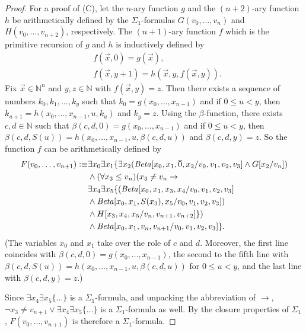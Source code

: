 \begin{proof}
For a proof of (C), let the $n$-ary function $g$ and the $(n+2)$-ary function $h$ be arithmetically defined by the $\Sigma_1$-formulas $G(v_0, \ldots, v_{n})$ and $H(v_0, \ldots, v_{n+2})$, respectively. The $(n+1)$-ary function $f$ which is the primitive recursion of $g$ and $h$ is inductively defined by 
\begin{align*}
&f(\overrightarrow{x}, 0) = g(\overrightarrow{x}), \\
& f(\overrightarrow{x}, y+1) = h( \overrightarrow{x}, y, f(\overrightarrow{x},y)). 
\end{align*}
Fix $\overrightarrow{x} \in \mathbb{N}^n$ and $y,z\in \mathbb{N}$ with $f(\overrightarrow{x}, y) = z$. Then there exists a sequence of numbers $k_0, k_1, \ldots, k_y$ such that $k_0 = g(x_0, \ldots, x_{n-1})$ and if  $0\le u<y$, then $k_{u+1} = h(x_0, \ldots, x_{n-1}, u, k_u)$ and $k_y = z$.  Using the $\beta$-function, there exists $c, d \in \mathbb{N}$ such that $\beta(c,d,0) = g(x_0, \ldots, x_{n-1})$ and if $0 \le u < y$, then \sloppy$\beta(c,d,S(u))= h(x_0, \ldots, x_{n-1},u, \beta(c,d,u))$ and $\beta(c,d,y) = z$. So the function $f$ can be arithmetically defined by
\begin{align*}
F(v_0,\ldots, v_{n+1}) \vcentcolon \equiv &\exists x_0 \exists x_1 \lbrace \exists x_2  (\mathit{Beta}[x_0,x_1,\overline{0},x_2/v_0,v_1,v_2,v_3] \wedge G[x_2/v_{n}] ) \\
&\wedge ( \forall x_3 \le v_{n} )  ( x_3 \neq v_{n} \rightarrow \\
& \exists x_4 \exists x_5  \lbrace ( \mathit{Beta}[x_0,x_1,x_3,x_4/v_0,v_1,v_2,v_3] \\
& \wedge \mathit{Beta}[x_0,x_1,S(x_3),x_5/v_0,v_1,v_2,v_3]) \\
& \wedge H[ x_3, x_4, x_5 / v_{n}, v_{n+1}, v_{n+2}] \rbrace ) \\
& \wedge \mathit{Beta}[x_0,x_1,v_{n},v_{n+1}/v_0,v_1,v_2,v_3]\rbrace. 
\end{align*}
(The variables $x_0$ and $x_1$ take over the role of $c$ and $d$. Moreover, the first line coincides with $\beta(c,d,0) = g(x_0, \ldots, x_{n-1})$, the second to the fifth line with $\beta(c,d,S(u))= h(x_0, \ldots, x_{n-1},u, \beta(c,d,u))$ for $0 \le u < y$, and the last line with $\beta(c,d,y) = z$.)

Since $\exists x_4 \exists x_5 \lbrace \ldots \rbrace$ is a $\Sigma_1$-formula, and unpacking the abbreviation of $\rightarrow$, $\lnot x_3 \neq v_{n+1} \vee \exists x_4 \exists x_5 \lbrace \ldots \rbrace$ is a $\Sigma_1$-formula as well. By the closure properties of $\Sigma_1$, $F(v_0,\ldots, v_{n+1})$ is therefore a $\Sigma_1$-formula.
\end{proof}

